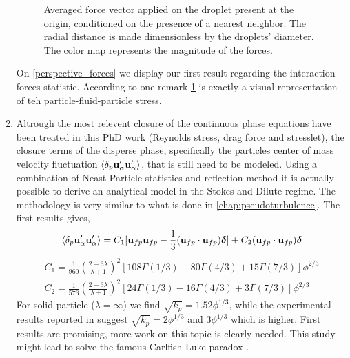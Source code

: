 \begin{enumerate}
\begin{figure}[h!]
        \caption{Averaged force vector applied on the droplet present at the origin, conditioned on the presence of a nearest neighbor.
        The radial distance is made dimensionless by the droplets' diameter. 
        The color map represents the magnitude of the forces.}
        \label{fig:perspective_forces}
    \end{figure}
    On \ref{perspective_forces} we display our first result regarding the interaction forces statistic. 
    According to \citet{zhang2021ensemble} one remark \ref{fig:perspective_forces} is exactly a visual representation of teh particle-fluid-particle stress. 
    \item Altrough the most relevent closure of the continuous phase equations have been treated in this PhD work (Reynolds stress, drag force and stresslet), the closure terms of the disperse phase, specifically the particles center of mass velocity fluctuation $\left<\delta_p \textbf{u}_\alpha'\textbf{u}_\alpha'\right>$, that is still need to be modeled. 
    Using a combination of Neast-Particle statistics and reflection method it is actually possible to derive an analytical model in the Stokes and Dilute regime. 
    The methodology is very similar to what is done in \ref{chap:pseudoturbulence}. 
    The first results gives, 
    \begin{equation*}
        \left<\delta_p \textbf{u}_\alpha'\textbf{u}_\alpha'\right>
        = 
        C_1[\textbf{u}_{fp}\textbf{u}_{fp} - \frac{1}{3}(\textbf{u}_{fp}\cdot \textbf{u}_{fp})\bm\delta] 
        + C_2(\textbf{u}_{fp}\cdot \textbf{u}_{fp})\bm\delta
    \end{equation*}
    \begin{align}
      C_1 = \frac{1}{960}\left(\frac{2+3\lambda}{\lambda+1}\right)^2 \left[
        108\Gamma(1/3)
        - 80\Gamma (4/3)
        +15\Gamma(7/3)
      \right]\phi^{2/3}\\
      C_2 = \frac{1}{576}\left(
        \frac{2+3\lambda}{\lambda+1}\right)^2 \left[
        24\Gamma(1/3)
        - 16\Gamma (4/3)
        +3\Gamma(7/3)
      \right]\phi^{2/3}
    \end{align}
    For solid particle ($\lambda=\infty$) we find $\sqrt{k_p} = 1.52\phi^{1/3}$, while the experimental results reported in \citet{guazzelli2011fluctuations} suggest $\sqrt{k_p} = 2\phi^{1/3}$ and $3\phi^{1/3}$ which is higher. 
    First results are promising, more work on this topic is clearly needed.
    This study might lead to solve the famous Carlfish-Luke paradox \citet{caflisch1985variance}. 
\end{enumerate}

